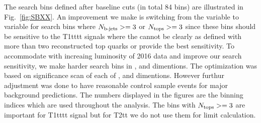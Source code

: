 

The search bins defined after baseline cuts (in total 84 bins) are illustrated in Fig.~\ref{fig:SBXX}. An improvement we make is switching from the \MTTwo variable to \HT variable for search bins where $N_{\text{b-jets}}>=3$ or $N_{\text{tops}}>=3$ since these bins should be sensitive to the T1tttt signals where the \MTTwo cannot be clearly as defined with more than two reconstructed top quarks or provide the best sensitivity. 
To accommodate with increaing luminosity of 2016 data and improve our search sensitivity, we make harder search bins in
\MET, \HT and \MTTwo dimentions. The optimization was based on significance scan of each of \MET, \MTTwo and \HT dimentions. However
furthur adjustment was done to have reasonable control sample events for major background predictions.
The numbers displayed in the figures are the binning indices which are used throughout the analysis.
The bins with $N_{\text{tops}}>=3$ are important for T1tttt signal but for T2tt we do not use them for limit calculation.

